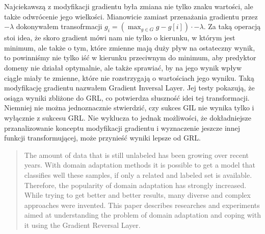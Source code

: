 \documentclass{article}
\begin{document}
Najciekawszą z modyfikacji gradientu była zmiana nie tylko znaku wartości, ale także odwrócenie jego wielkości. Mianowicie zamiast przenażania gradientu przez $-\lambda$ dokonywałem transofrmacji $g_{i} = (\max_{g \in G} g - g[i]) \cdot -\lambda$. Za taką operacją stoi idea, że skoro gradient mówi nam nie tylko o kierunku, w którym jest minimum, ale także o tym, które zmienne mają duży pływ na ostateczny wynik, to powinniśmy nie tylko iść w kierunku przeciwnym do minimum, aby predyktor domeny nie działał optymalnie, ale także sprawiać, by na jego wynik wpływ ciągle miały te zmienne, które nie rozstrzygają o wartościach jego wyniku. Taką modyfikację gradientu nazwałem Gradient Inversal Layer. Jej testy pokazują, że osiąga wyniki zbliżone do GRL, co potwierdza słuszność idei tej transformacji. Niemniej nie można jednoznacznie stwierdzić, czy sukces GIL nie wynika tylko i wyłącznie z sukcesu GRL. Nie wyklucza to jednak możliwości, że dokładniejsze przanalizowanie konceptu modyfikacji gradientu i wyznaczenie jeszcze innej funkcji transformującej, może przynieść wyniki lepsze od GRL.

\begin{abstract}
The amount of data that is still unlabeled has been growing over recent years. With domain adaptation methods it is possible to get a model that classifies well these samples, if only a related and labeled set is available. Therefore, the popularity of domain adaptation has strongly increased. While trying to get better and better results, many diverse and complex approaches were invented. This paper describes researches and experiments aimed at understanding the problem of domain adaptation and coping with it using the Gradient Reversal Layer.
\end{abstract}
\end{document}
